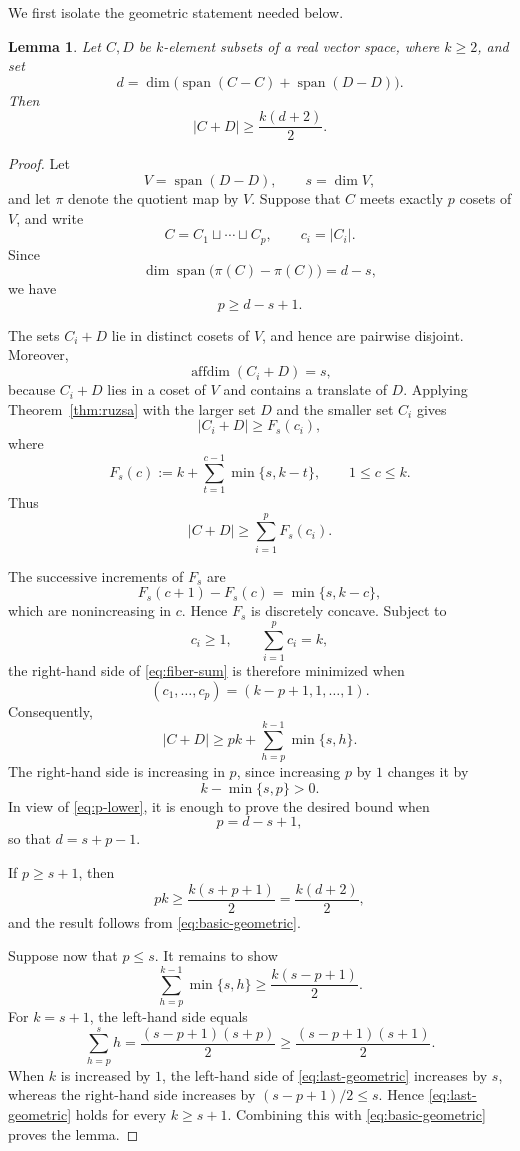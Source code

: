 \documentclass[11pt]{article}
\newtheorem{lemma}[theorem]{Lemma}
\newcommand{\affdim}{\operatorname{affdim}}
\newcommand{\spann}{\operatorname{span}}
\begin{document}
We first isolate the geometric statement needed below.

\begin{lemma}\label{lem:geometric}
Let $C,D$ be $k$-element subsets of a real vector space, where $k\ge2$, and set
\[
 d=\dim\bigl(\spann(C-C)+\spann(D-D)\bigr).
\]
Then
\[
 |C+D|\ge \frac{k(d+2)}2.
\]
\end{lemma}

\begin{proof}
Let
\[
 V=\spann(D-D),\qquad s=\dim V,
\]
and let $\pi$ denote the quotient map by $V$.  Suppose that $C$ meets exactly $p$ cosets of $V$, and write
\[
 C=C_1\sqcup\cdots\sqcup C_p,
 \qquad c_i=|C_i|.
\]
Since
\[
 \dim\spann\bigl(\pi(C)-\pi(C)\bigr)=d-s,
\]
we have
\begin{equation}\label{eq:p-lower}
 p\ge d-s+1.
\end{equation}

The sets $C_i+D$ lie in distinct cosets of $V$, and hence are pairwise disjoint.  Moreover,
\[
 \affdim(C_i+D)=s,
\]
because $C_i+D$ lies in a coset of $V$ and contains a translate of $D$.  Applying Theorem~\ref{thm:ruzsa} with the larger set $D$ and the smaller set $C_i$ gives
\[
 |C_i+D|\ge F_s(c_i),
\]
where
\[
 F_s(c):=k+\sum_{t=1}^{c-1}\min\{s,k-t\},\qquad 1\le c\le k.
\]
Thus
\begin{equation}\label{eq:fiber-sum}
 |C+D|\ge\sum_{i=1}^pF_s(c_i).
\end{equation}

The successive increments of $F_s$ are
\[
 F_s(c+1)-F_s(c)=\min\{s,k-c\},
\]
which are nonincreasing in $c$.  Hence $F_s$ is discretely concave.  Subject to
\[
 c_i\ge1,\qquad \sum_{i=1}^pc_i=k,
\]
the right-hand side of \eqref{eq:fiber-sum} is therefore minimized when
\[
 (c_1,\ldots,c_p)=(k-p+1,1,\ldots,1).
\]
Consequently,
\begin{equation}\label{eq:basic-geometric}
 |C+D|\ge pk+\sum_{h=p}^{k-1}\min\{s,h\}.
\end{equation}
The right-hand side is increasing in $p$, since increasing $p$ by $1$ changes it by
\[
 k-\min\{s,p\}>0.
\]
In view of \eqref{eq:p-lower}, it is enough to prove the desired bound when
\[
 p=d-s+1,
\]
so that $d=s+p-1$.

If $p\ge s+1$, then
\[
 pk\ge \frac{k(s+p+1)}2=\frac{k(d+2)}2,
\]
and the result follows from \eqref{eq:basic-geometric}.

Suppose now that $p\le s$.  It remains to show
\begin{equation}\label{eq:last-geometric}
 \sum_{h=p}^{k-1}\min\{s,h\}\ge \frac{k(s-p+1)}2.
\end{equation}
For $k=s+1$, the left-hand side equals
\[
 \sum_{h=p}^{s}h=\frac{(s-p+1)(s+p)}2
 \ge \frac{(s-p+1)(s+1)}2.
\]
When $k$ is increased by $1$, the left-hand side of \eqref{eq:last-geometric} increases by $s$, whereas the right-hand side increases by $(s-p+1)/2\le s$.  Hence \eqref{eq:last-geometric} holds for every $k\ge s+1$.  Combining this with \eqref{eq:basic-geometric} proves the lemma.
\end{proof}
\end{document}
